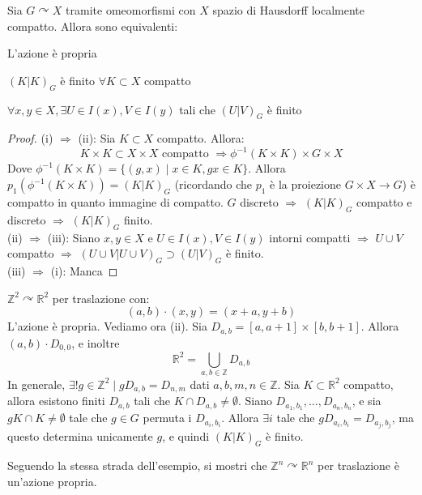 \begin{thm}
Sia $G \curvearrowright X$ tramite omeomorfismi con $X$ spazio di Hausdorff localmente compatto. Allora sono equivalenti:
\begin{nlist}
\item L'azione è propria
\item $(K|K)_G$ è finito $\forall K \subset X$ compatto
\item $\forall x,y \in X, \exists U \in I(x), V \in I(y)$ tali che $(U|V)_G$ è finito
\end{nlist}
\end{thm}
\begin{proof}
(i) $\Longrightarrow$ (ii): Sia $K \subset X$ compatto. Allora:
$$K \times K \subset X \times X \text{ compatto } \Longrightarrow \phi ^{-1} (K \times K) \times G \times X$$
Dove $\phi ^{-1}(K \times K)=\{(g,x) \mid x \in K, gx \in K\}$. Allora $p_1(\phi ^{-1}(K \times K))=(K|K)_G$ (ricordando che $p_1$ è la proiezione $G\times X \longrightarrow G$) è compatto in quanto immagine di compatto. $G$ discreto $\Longrightarrow$ $(K|K)_G$ compatto e discreto $\Longrightarrow$ $(K|K)_G$ finito.\\
(ii) $\Longrightarrow$ (iii): Siano $x,y \in X$ e $U \in I(x), V \in I(y)$ intorni compatti $\Longrightarrow$ $U \cup V$ compatto $\Longrightarrow$ $(U \cup V | U \cup V)_G \supset (U|V)_G$ è finito.\\
(iii) $\Longrightarrow$ (i): Manca
\end{proof}

\begin{ex}
$\mathbb{Z}^2 \curvearrowright \mathbb{R}^2$ per traslazione con:
$$(a,b) \cdot (x,y)=(x+a,y+b)$$
L'azione è propria. Vediamo ora (ii). Sia $D_{a,b}=[a,a+1] \times [b,b+1]$. Allora $(a,b) \cdot D_{0,0}$, e inoltre
$$\mathbb{R}^2=\bigcup _{a,b \in \mathbb{Z}} D_{a,b}$$
In generale, $\exists ! g \in \mathbb{Z}^2 \mid gD_{a,b}=D_{n,m}$ dati $a,b,m,n \in \mathbb{Z}$. Sia $K \subset \mathbb{R}^2$ compatto, allora esistono finiti $D_{a,b}$ tali che $K \cap D_{a,b} \neq \emptyset$. Siano $D_{a_1,b_1}, \dots ,D_{a_n,b_n}$, e sia $gK \cap K \neq \emptyset$ tale che $g \in G$ permuta i $D_{a_i,b_i}$. Allora $\exists i$ tale che $gD_{a_i,b_i}=D_{a_j,b_j}$, ma questo determina unicamente $g$, e quindi $(K|K)_G$ è finito.
\end{ex}

\begin{exc}
  Seguendo la stessa strada dell'esempio, si mostri che $\mathbb{Z}^n \curvearrowright \mathbb{R}^n$ per traslazione è un'azione propria.
\end{exc}

